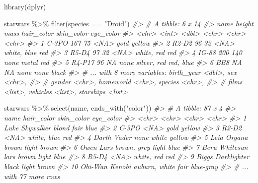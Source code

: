 \documentclass[
]{book}
\newenvironment{Shaded}{\begin{snugshade}}{\end{snugshade}}
\newcommand{\CommentTok}[1]{\textcolor[rgb]{0.56,0.35,0.01}{\textit{#1}}}
\newcommand{\FunctionTok}[1]{\textcolor[rgb]{0.00,0.00,0.00}{#1}}
\newcommand{\NormalTok}[1]{#1}
\newcommand{\SpecialCharTok}[1]{\textcolor[rgb]{0.00,0.00,0.00}{#1}}
\newcommand{\StringTok}[1]{\textcolor[rgb]{0.31,0.60,0.02}{#1}}
\begin{document}
\begin{Shaded}
\begin{Highlighting}[]
\FunctionTok{library}\NormalTok{(dplyr)}

\NormalTok{starwars }\SpecialCharTok{\%\textgreater{}\%} 
  \FunctionTok{filter}\NormalTok{(species }\SpecialCharTok{==} \StringTok{"Droid"}\NormalTok{)}
\CommentTok{\#\textgreater{} \# A tibble: 6 x 14}
\CommentTok{\#\textgreater{}   name   height  mass hair\_color skin\_color  eye\_color}
\CommentTok{\#\textgreater{}   \textless{}chr\textgreater{}   \textless{}int\textgreater{} \textless{}dbl\textgreater{} \textless{}chr\textgreater{}      \textless{}chr\textgreater{}       \textless{}chr\textgreater{}    }
\CommentTok{\#\textgreater{} 1 C{-}3PO     167    75 \textless{}NA\textgreater{}       gold        yellow   }
\CommentTok{\#\textgreater{} 2 R2{-}D2      96    32 \textless{}NA\textgreater{}       white, blue red      }
\CommentTok{\#\textgreater{} 3 R5{-}D4      97    32 \textless{}NA\textgreater{}       white, red  red      }
\CommentTok{\#\textgreater{} 4 IG{-}88     200   140 none       metal       red      }
\CommentTok{\#\textgreater{} 5 R4{-}P17     96    NA none       silver, red red, blue}
\CommentTok{\#\textgreater{} 6 BB8        NA    NA none       none        black    }
\CommentTok{\#\textgreater{} \# ... with 8 more variables: birth\_year \textless{}dbl\textgreater{}, sex \textless{}chr\textgreater{},}
\CommentTok{\#\textgreater{} \#   gender \textless{}chr\textgreater{}, homeworld \textless{}chr\textgreater{}, species \textless{}chr\textgreater{},}
\CommentTok{\#\textgreater{} \#   films \textless{}list\textgreater{}, vehicles \textless{}list\textgreater{}, starships \textless{}list\textgreater{}}


\NormalTok{starwars }\SpecialCharTok{\%\textgreater{}\%} 
  \FunctionTok{select}\NormalTok{(name, }\FunctionTok{ends\_with}\NormalTok{(}\StringTok{"color"}\NormalTok{))}
\CommentTok{\#\textgreater{} \# A tibble: 87 x 4}
\CommentTok{\#\textgreater{}    name               hair\_color    skin\_color  eye\_color}
\CommentTok{\#\textgreater{}    \textless{}chr\textgreater{}              \textless{}chr\textgreater{}         \textless{}chr\textgreater{}       \textless{}chr\textgreater{}    }
\CommentTok{\#\textgreater{}  1 Luke Skywalker     blond         fair        blue     }
\CommentTok{\#\textgreater{}  2 C{-}3PO              \textless{}NA\textgreater{}          gold        yellow   }
\CommentTok{\#\textgreater{}  3 R2{-}D2              \textless{}NA\textgreater{}          white, blue red      }
\CommentTok{\#\textgreater{}  4 Darth Vader        none          white       yellow   }
\CommentTok{\#\textgreater{}  5 Leia Organa        brown         light       brown    }
\CommentTok{\#\textgreater{}  6 Owen Lars          brown, grey   light       blue     }
\CommentTok{\#\textgreater{}  7 Beru Whitesun lars brown         light       blue     }
\CommentTok{\#\textgreater{}  8 R5{-}D4              \textless{}NA\textgreater{}          white, red  red      }
\CommentTok{\#\textgreater{}  9 Biggs Darklighter  black         light       brown    }
\CommentTok{\#\textgreater{} 10 Obi{-}Wan Kenobi     auburn, white fair        blue{-}gray}
\CommentTok{\#\textgreater{} \# ... with 77 more rows}



\end{Highlighting}
\end{Shaded}
\end{document}
